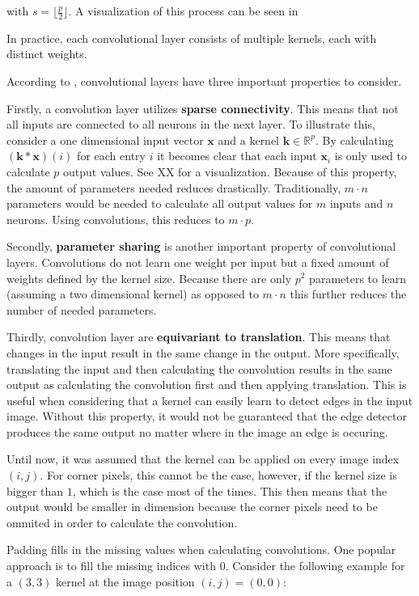 with $s = \lfloor \frac{p}{2} \rfloor$.
A visualization of this process can be seen in %

In practice, each convolutional layer consists of multiple kernels, each with distinct weights.


According to \cite{goodfellow_deep_2016}, convolutional layers have three important properties to consider.

Firstly, a convolution layer utilizes \textbf{sparse connectivity}.
This means that not all inputs are connected to all neurons in the next layer.
To illustrate this, consider a one dimensional input vector $\bm{x}$ and a kernel $\bm{k} \in \mathbb{R}^p$.
By calculating $(\bm{k} * \bm{x})(i)$ for each entry $i$ it becomes clear that each input $\bm{x}_i$ is only used to calculate $p$ output values.
See XX for a visualization. %
Because of this property, the amount of parameters needed reduces drastically.
Traditionally, $m \cdot n$ parameters would be needed to calculate all output values for $m$ inputs and $n$ neurons.
Using convolutions, this reduces to $m \cdot p$.

Secondly, \textbf{parameter sharing} is another important property of convolutional layers.
Convolutions do not learn one weight per input but a fixed amount of weights defined by the kernel size.
Because there are only $p^2$ parameters to learn (assuming a two dimensional kernel) as opposed to $m \cdot n$ this further reduces the number of needed parameters. 

Thirdly, convolution layer are \textbf{equivariant to translation}.
This means that changes in the input result in the same change in the output.
More specifically, translating the input and then calculating the convolution results in the same output as calculating the convolution first and then applying translation.
This is useful when considering that a kernel can easily learn to detect edges in the input image.
Without this property, it would not be guaranteed that the edge detector produces the same output no matter where in the image an edge is occuring.

Until now, it was assumed that the kernel can be applied on every image index $(i,j)$.
For corner pixels, this cannot be the case, however, if the kernel size is bigger than $1$, which is the case most of the times.
This then means that the output would be smaller in dimension because the corner pixels need to be ommited in order to calculate the convolution.

Padding fills in the missing values when calculating convolutions.
One popular approach is to fill the missing indices with $0$. Consider the following example for a $(3,3)$ kernel at the image position $(i,j) = (0,0)$:

